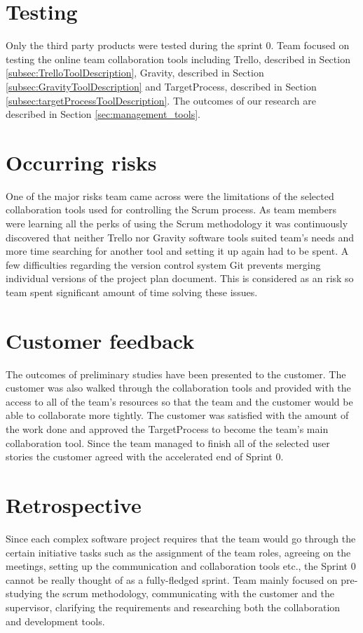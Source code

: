 \section{Testing}

Only the third party products were tested during the sprint 0. Team focused on testing the online team collaboration tools including Trello, described in Section \ref{subsec:TrelloToolDescription}, Gravity, described in Section \ref{subsec:GravityToolDescription} and TargetProcess, described in Section \ref{subsec:targetProcessToolDescription}. The outcomes of our research are described in Section \ref{sec:management_tools}.

\section{Occurring risks}

One of the major risks team came across were the limitations of the selected collaboration tools used for controlling the Scrum process. As team members were learning all the perks of using the Scrum methodology it was continuously discovered that neither Trello nor Gravity software tools suited team's needs and more time searching for another tool and setting it up again had to be spent. A few difficulties regarding the version control system Git prevents merging individual versions of the project plan document. This is considered as an risk so team spent significant amount of time solving these issues.

\section{Customer feedback}

The outcomes of preliminary studies have been presented to the customer. The customer was also walked through the collaboration tools and provided with the access to all of the team's resources so that the team and the customer would be able to collaborate more tightly. The customer was satisfied with the amount of the work done and approved the TargetProcess to become the team's main collaboration tool. Since the team managed to finish all of the selected user stories the customer agreed with the accelerated end of Sprint 0.

\section{Retrospective}
Since each complex software project requires that the team would go through the certain initiative tasks such as the assignment of the team roles, agreeing on the meetings, setting up the communication and collaboration tools etc., the Sprint 0 cannot be really thought of as a fully-fledged sprint. Team mainly focused on pre-studying the scrum methodology, communicating with the customer and the supervisor, clarifying the requirements and researching both the collaboration and development tools.

